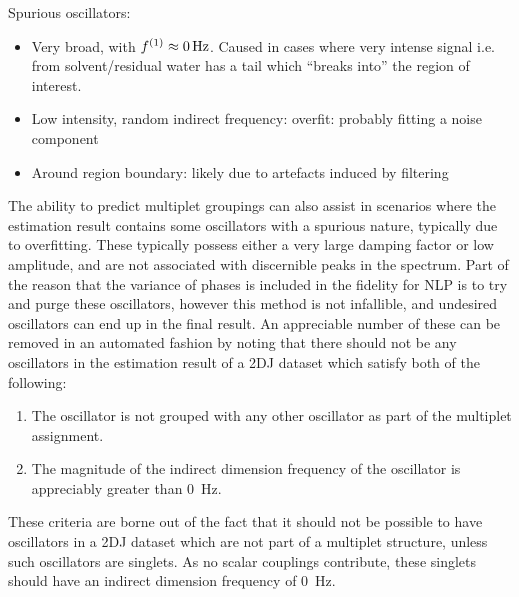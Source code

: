Spurious oscillators:
\begin{itemize}
    \item Very broad, with $f^{(1)} \approx \qty{0}{\hertz}$. Caused in cases where very intense signal i.e. from solvent/residual water has a tail which ``breaks into'' the region of interest.
    \item Low intensity, random indirect frequency: overfit: probably fitting a
        noise component
    \item Around region boundary: likely due to artefacts induced by filtering
\end{itemize}
The ability to predict multiplet groupings can also assist in scenarios where
the estimation result contains some oscillators with a spurious nature,
typically due to overfitting. These typically possess either a very large
damping factor or low amplitude, and are not associated with discernible peaks
in the spectrum. Part of the reason that the variance of phases is included in
the fidelity for \ac{NLP} is to try and purge these oscillators, however this
method is not infallible, and undesired oscillators can end up in the final
result. An appreciable number of these can be removed in an automated fashion
by noting that there should not be any oscillators in the estimation result of
a 2DJ dataset which satisfy both of the following:
\begin{enumerate}
    \item The oscillator is not grouped with any other oscillator as part of
        the multiplet assignment.
    \item The magnitude of the indirect dimension frequency of the oscillator
        is appreciably greater than \qty{0}{\hertz}.
\end{enumerate}
These criteria are borne out of the fact that it should not be possible to have
oscillators in a 2DJ dataset which are not part of a multiplet structure,
unless such oscillators are singlets. As no scalar couplings contribute, these
singlets should have an indirect dimension frequency of \qty{0}{\hertz}.
